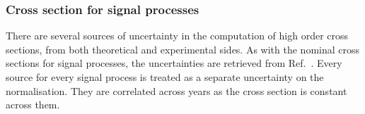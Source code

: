 \subsubsection{Cross section for signal processes}
\label{subsubsec:htoinv_signal_xs_syst}

There are several sources of uncertainty in the computation of high order cross sections, from both theoretical and experimental sides. As with the nominal cross sections for signal processes, the uncertainties are retrieved from Ref.~. Every source for every signal process is treated as a separate uncertainty on the normalisation. They are correlated across years as the cross section is constant across them.




